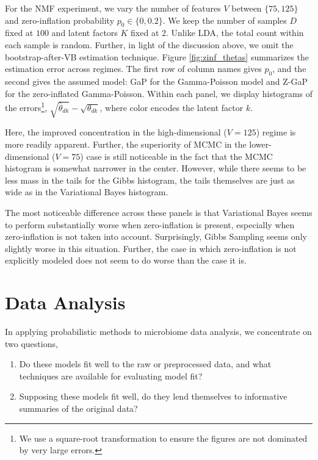 \documentclass[oupdraft]{bio}
\begin{document}
For the NMF experiment, we vary the number of features $V$ between $\{75, 125\}$
and zero-inflation probability $p_{0} \in \{0, 0.2\}$. We keep the number of samples
$D$ fixed at $100$ and latent factors $K$ fixed at 2. Unlike LDA, the total
count within each sample is random. Further, in light of the discussion above,
we omit the bootstrap-after-VB estimation technique. Figure
\ref{fig:zinf_thetas} summarizes the estimation error across regimes. The first
row of column names gives $p_{0}$, and the second gives the assumed model: GaP
for the Gamma-Poisson model and Z-GaP for the zero-inflated Gamma-Poisson.
Within each panel, we display histograms of the errors\footnote{We use a
  square-root transformation to ensure the figures are not dominated by very
  large errors.}, $\sqrt{\hat{\theta}_{dk}} - \sqrt{\theta_{dk}}$, where color
encodes the latent factor $k$.

Here, the improved concentration in the high-dimensional ($V = 125$) regime is
more readily apparent. Further, the superiority of MCMC in the
lower-dimensional ($V = 75$) case is still noticeable in the fact that the MCMC
histogram is somewhat narrower in the center. However, while there seems to be
less mass in the tails for the Gibbs histogram, the tails themselves are just as
wide as in the Variational Bayes histogram.

The most noticeable difference across these panels is that Variational Bayes
seems to perform substantially worse when zero-inflation is present, especially
when zero-inflation is not taken into account. Surprisingly, Gibbs Sampling
seems only slightly worse in this situation. Further, the case in which
zero-inflation is not explicitly modeled does not seem to do worse than the case
it is.

\section{Data Analysis}

In applying probabilistic methods to microbiome data analysis, we concentrate on
two questions,
\begin{enumerate}
\item Do these models fit well to the raw or preprocessed data, and what techniques
are available for evaluating model fit?
\item Supposing these models fit well, do they lend themselves to informative
summaries of the original data?
\end{enumerate}
\end{document}
